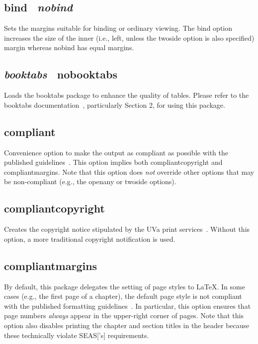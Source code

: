 \documentclass[10pt]{article}
\newcommand{\package}[1]{#1}
\newcommand{\option}[1]{#1}
\newcommand{\default}[1]{\emph{#1}}
\begin{document}
\subsection{\option{bind} \textbar\ \default{\option{nobind}}}
Sets the margins suitable for binding or ordinary viewing.
The bind option increases the size of the inner (i.e., left, unless the \option{twoside} option is also specified) margin whereas nobind has equal margins.

\subsection{\default{\option{booktabs}} \textbar\ \option{nobooktabs}}
Loads the \package{booktabs} package to enhance the quality of tables.
Please refer to the \package{booktabs} documentation~\cite{fear:booktabs}, particularly Section 2, for using this package.

\subsection{\option{compliant}}
Convenience option to make the output as compliant as possible with the published guidelines~\cite{uvaprint:thesis, seas:instructions}.
This option implies both \option{compliantcopyright} and \option{compliantmargins}.
Note that this option does \emph{not} override other options that may be non-compliant (e.g., the \option{openany} or \option{twoside} options).

\subsection{\option{compliantcopyright}}
Creates the copyright notice stipulated by the \gls{UVa} print services~\cite{uvaprint:thesis}.
Without this option, a more traditional copyright notification is used.

\subsection{\option{compliantmargins}}
By default, this package delegates the setting of page styles to \LaTeX.
In some cases (e.g., the first page of a chapter), the default page style is not compliant with the published formatting guidelines~\cite{uvaprint:thesis, seas:instructions}.
In particular, this option ensures that page numbers \emph{always} appear in the upper-right corner of pages.
Note that this option also disables printing the chapter and section titles in the header because these technically violate \gls{SEAS}['s] requirements.
\end{document}

